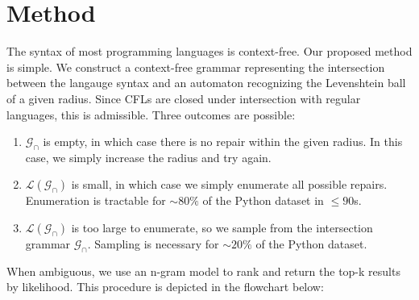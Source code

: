 \section{Method}

The syntax of most programming languages is context-free. Our proposed method is simple. We construct a context-free grammar representing the intersection between the langauge syntax and an automaton recognizing the Levenshtein ball of a given radius. Since CFLs are closed under intersection with regular languages, this is admissible. Three outcomes are possible:

\begin{enumerate}
  \item $\mathcal{G}_\cap$ is empty, in which case there is no repair within the given radius. In this case, we simply increase the radius and try again.
  \item $\mathcal{L}(\mathcal{G}_\cap)$ is small, in which case we simply enumerate all possible repairs. Enumeration is tractable for $\sim 80\%$ of the Python dataset in $\leq 90$s.
  \item $\mathcal{L}(\mathcal{G}_\cap)$ is too large to enumerate, so we sample from the intersection grammar $\mathcal{G}_\cap$. Sampling is necessary for $\sim20\%$ of the Python dataset.
\end{enumerate}

When ambiguous, we use an n-gram model to rank and return the top-k results by likelihood. This procedure is depicted in the flowchart below:

